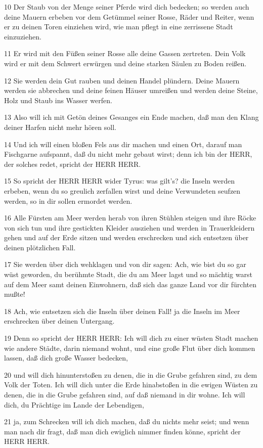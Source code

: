 \par 10 Der Staub von der Menge seiner Pferde wird dich bedecken; so werden auch deine Mauern erbeben vor dem Getümmel seiner Rosse, Räder und Reiter, wenn er zu deinen Toren einziehen wird, wie man pflegt in eine zerrissene Stadt einzuziehen.
\par 11 Er wird mit den Füßen seiner Rosse alle deine Gassen zertreten. Dein Volk wird er mit dem Schwert erwürgen und deine starken Säulen zu Boden reißen.
\par 12 Sie werden dein Gut rauben und deinen Handel plündern. Deine Mauern werden sie abbrechen und deine feinen Häuser umreißen und werden deine Steine, Holz und Staub ins Wasser werfen.
\par 13 Also will ich mit Getön deines Gesanges ein Ende machen, daß man den Klang deiner Harfen nicht mehr hören soll.
\par 14 Und ich will einen bloßen Fels aus dir machen und einen Ort, darauf man Fischgarne aufspannt, daß du nicht mehr gebaut wirst; denn ich bin der HERR, der solches redet, spricht der HERR HERR.
\par 15 So spricht der HERR HERR wider Tyrus: was gilt's? die Inseln werden erbeben, wenn du so greulich zerfallen wirst und deine Verwundeten seufzen werden, so in dir sollen ermordet werden.
\par 16 Alle Fürsten am Meer werden herab von ihren Stühlen steigen und ihre Röcke von sich tun und ihre gestickten Kleider ausziehen und werden in Trauerkleidern gehen und auf der Erde sitzen und werden erschrecken und sich entsetzen über deinen plötzlichen Fall.
\par 17 Sie werden über dich wehklagen und von dir sagen: Ach, wie bist du so gar wüst geworden, du berühmte Stadt, die du am Meer lagst und so mächtig warst auf dem Meer samt deinen Einwohnern, daß sich das ganze Land vor dir fürchten mußte!
\par 18 Ach, wie entsetzen sich die Inseln über deinen Fall! ja die Inseln im Meer erschrecken über deinen Untergang.
\par 19 Denn so spricht der HERR HERR: Ich will dich zu einer wüsten Stadt machen wie andere Städte, darin niemand wohnt, und eine große Flut über dich kommen lassen, daß dich große Wasser bedecken,
\par 20 und will dich hinunterstoßen zu denen, die in die Grube gefahren sind, zu dem Volk der Toten. Ich will dich unter die Erde hinabstoßen in die ewigen Wüsten zu denen, die in die Grube gefahren sind, auf daß niemand in dir wohne. Ich will dich, du Prächtige im Lande der Lebendigen,
\par 21 ja, zum Schrecken will ich dich machen, daß du nichts mehr seist; und wenn man nach dir fragt, daß man dich ewiglich nimmer finden könne, spricht der HERR HERR.


